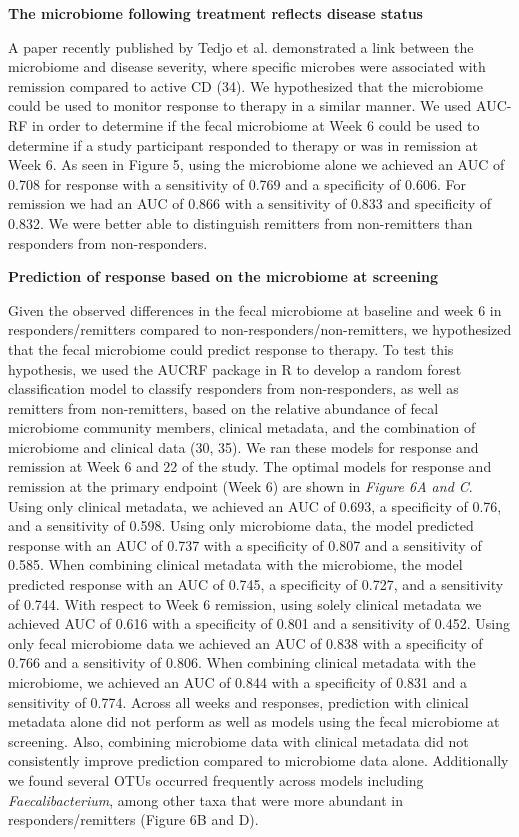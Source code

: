\documentclass[11pt,]{article}
\begin{document}
\textbf{The microbiome following treatment reflects disease status}

A paper recently published by Tedjo et al. demonstrated a link between
the microbiome and disease severity, where specific microbes were
associated with remission compared to active CD (34). We hypothesized
that the microbiome could be used to monitor response to therapy in a
similar manner. We used AUC-RF in order to determine if the fecal
microbiome at Week 6 could be used to determine if a study participant
responded to therapy or was in remission at Week 6. As seen in Figure 5,
using the microbiome alone we achieved an AUC of 0.708 for response with
a sensitivity of 0.769 and a specificity of 0.606. For remission we had
an AUC of 0.866 with a sensitivity of 0.833 and specificity of 0.832. We
were better able to distinguish remitters from non-remitters than
responders from non-responders.

\textbf{Prediction of response based on the microbiome at screening}

Given the observed differences in the fecal microbiome at baseline and
week 6 in responders/remitters compared to non-responders/non-remitters,
we hypothesized that the fecal microbiome could predict response to
therapy. To test this hypothesis, we used the AUCRF package in R to
develop a random forest classification model to classify responders from
non-responders, as well as remitters from non-remitters, based on the
relative abundance of fecal microbiome community members, clinical
metadata, and the combination of microbiome and clinical data (30, 35).
We ran these models for response and remission at Week 6 and 22 of the
study. The optimal models for response and remission at the primary
endpoint (Week 6) are shown in \emph{Figure 6A and C}. Using only
clinical metadata, we achieved an AUC of 0.693, a specificity of 0.76,
and a sensitivity of 0.598. Using only microbiome data, the model
predicted response with an AUC of 0.737 with a specificity of 0.807 and
a sensitivity of 0.585. When combining clinical metadata with the
microbiome, the model predicted response with an AUC of 0.745, a
specificity of 0.727, and a sensitivity of 0.744. With respect to Week 6
remission, using solely clinical metadata we achieved AUC of 0.616 with
a specificity of 0.801 and a sensitivity of 0.452. Using only fecal
microbiome data we achieved an AUC of 0.838 with a specificity of 0.766
and a sensitivity of 0.806. When combining clinical metadata with the
microbiome, we achieved an AUC of 0.844 with a specificity of 0.831 and
a sensitivity of 0.774. Across all weeks and responses, prediction with
clinical metadata alone did not perform as well as models using the
fecal microbiome at screening. Also, combining microbiome data with
clinical metadata did not consistently improve prediction compared to
microbiome data alone. Additionally we found several OTUs occurred
frequently across models including \emph{Faecalibacterium}, among other
taxa that were more abundant in responders/remitters (Figure 6B and D).
\end{document}
